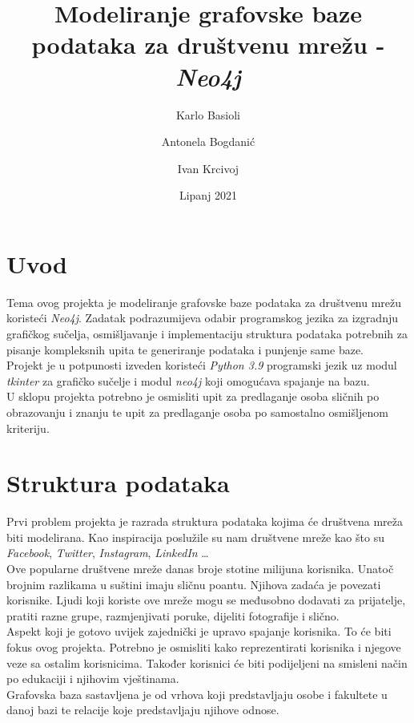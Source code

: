 \documentclass[titlepage, 12pt]{scrartcl}
\title{Modeliranje grafovske baze podataka za društvenu mrežu - \emph{Neo4j}}
\author{Karlo Basioli \and 
        Antonela Bogdanić \and 
        Ivan Krcivoj }
\date{Lipanj 2021}
\begin{document}
\maketitle

\tableofcontents

\newpage

\section{Uvod}
Tema ovog projekta je modeliranje grafovske baze podataka za društvenu mrežu koristeći \emph{Neo4j}. Zadatak podrazumijeva odabir programskog jezika za izgradnju grafičkog sučelja, osmišljavanje i implementaciju struktura podataka potrebnih za pisanje kompleksnih upita te generiranje podataka i punjenje same baze. \\
Projekt je u potpunosti izveden koristeći \emph{Python 3.9} programski jezik uz modul \emph{tkinter} za grafičko sučelje i modul \emph{neo4j} koji omogućava spajanje na bazu. \\
U sklopu projekta potrebno je osmisliti upit za predlaganje osoba sličnih po obrazovanju i znanju te upit za predlaganje osoba po samostalno osmišljenom kriteriju.

\newpage
\section{Struktura podataka}
Prvi problem projekta je razrada struktura podataka kojima će društvena mreža biti modelirana. Kao inspiracija poslužile su nam društvene mreže kao što su \emph{Facebook}, \emph{Twitter}, \emph{Instagram}, \emph{LinkedIn} \dots \\
Ove popularne društvene mreže danas broje stotine milijuna korisnika. Unatoč brojnim razlikama u suštini imaju sličnu poantu. Njihova zadaća je povezati korisnike. Ljudi koji koriste ove mreže mogu se međusobno dodavati za prijatelje, pratiti razne grupe, razmjenjivati poruke, dijeliti fotografije i slično. \\
Aspekt koji je gotovo uvijek zajednički je upravo spajanje korisnika. To će biti fokus ovog projekta. Potrebno je osmisliti kako reprezentirati korisnika i njegove veze sa ostalim korisnicima. Također korisnici će biti podijeljeni na smisleni način po edukaciji i njihovim vještinama. \\
Grafovska baza sastavljena je od vrhova koji predstavljaju osobe i fakultete u danoj bazi te relacije koje predstavljaju njihove odnose.
\end{document}
